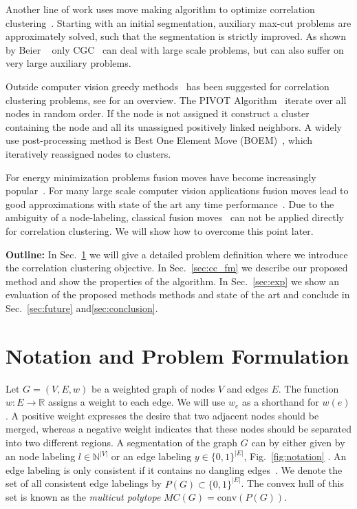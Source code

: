 Another line of work uses move making algorithm 
to optimize correlation clustering~\cite{bansal_2004_ml,beier_2014_cvpr,Kernighan-1970}.
Starting with an initial segmentation, auxiliary max-cut problems are approximately solved,
such that the segmentation is strictly improved.
As shown by Beier \etal~\cite{beier_2014_cvpr} only CGC~\cite{beier_2014_cvpr} 
can deal with large scale problems, but can also suffer on very large auxiliary problems.

Outside computer vision greedy methods~\cite{Soon-2001,Ng-2002,Gionis-2007,Elsner-2008,Ailon-2008} has been suggested for correlation clustering problems, see \cite{Elsner-2009} for an overview.
The PIVOT Algorithm~\cite{Ailon-2008} iterate over all nodes in random order.
If the node is not assigned it construct a cluster containing the node and all its 
unassigned positively linked neighbors.  
%
A widely use post-processing method is  Best One Element Move (BOEM)~\cite{Gionis-2007}, which iteratively reassigned nodes to clusters.

For energy minimization problems fusion moves have become increasingly popular~\cite{Lempitsky-2010,kappes_2014_ws}.
For many large scale computer vision applications fusion moves lead to good approximations
with state of the art any time performance~\cite{kappes_2014_ws}.
Due to the ambiguity of a node-labeling, classical fusion moves~\cite{Lempitsky-2010} can not be applied directly for correlation clustering.
We will show how to overcome this point later.


\vspace{0.1cm}
\noindent \textbf{Outline:} 
In Sec.~\ref{sec:problem_formulation} we will give a 
detailed problem definition where we introduce 
the correlation clustering objective.
In Sec.~\ref{sec:cc_fm} we describe our proposed
method and show the properties of the algorithm.
In Sec.~\ref{sec:exp} we show an evaluation
of the proposed methods methods and state of the art
and conclude in Sec.~\ref{sec:future} and\ref{sec:conclusion}.

\section{Notation and Problem Formulation}\label{sec:problem_formulation}
Let $G=(V,E, w)$ be a weighted graph of nodes $V$ and edges $E$.
%
The function $w : E \rightarrow \mathbb{R}$ assigns a weight to each edge.
We will use $w_e$ as a shorthand for $w(e)$.
A positive weight expresses the desire that two adjacent nodes should
be merged, whereas a negative weight indicates
that these nodes should be separated into two different regions.
%
%
A segmentation of the graph $G$ can by either given by an 
node labeling $l \in \mathbb{N}^{|V|}$
or an edge labeling $y \in\{0,1\}^{|E|}$, \cf Fig.~\ref{fig:notation} .
An edge labeling is only consistent if it contains no dangling edges~\cite{kappes_2013_arxiv}.
We denote the set of all consistent edge labelings by $P(G)\subset\{0,1\}^{|E|}$.
The convex hull of this set is known as the \emph{multicut polytope} $MC(G) = \textrm{conv}(P(G))$.

